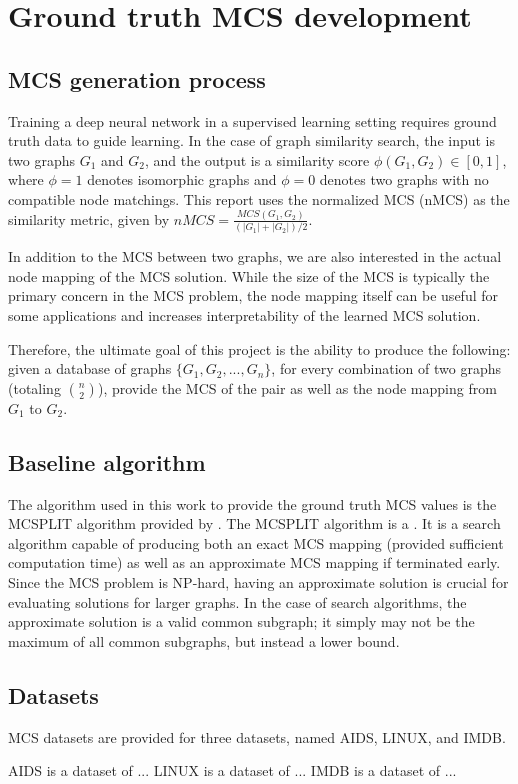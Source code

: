 \section{Ground truth MCS development}
\subsection{MCS generation process}
Training a deep neural network in a supervised learning setting requires ground truth data to guide learning. In the case of graph similarity search, the input is two graphs $G_1$ and $G_2$, and the output is a similarity score $\phi(G_1, G_2) \in [0, 1]$, where $\phi = 1$ denotes isomorphic graphs and $\phi = 0$ denotes two graphs with no compatible node matchings. This report uses the normalized MCS (nMCS) as the similarity metric, given by $nMCS = \frac{MCS(G_1, G_2)}{(|G_1| + |G_2|)/2}$.

In addition to the MCS between two graphs, we are also interested in the actual node mapping of the MCS solution. While the size of the MCS is typically the primary concern in the MCS problem, the node mapping itself can be useful for some applications and increases interpretability of the learned MCS solution.

Therefore, the ultimate goal of this project is the ability to produce the following: given a database of graphs $\{G_1, G_2, ..., G_n\}$, for every combination of two graphs (totaling ${n \choose 2}$), provide the MCS of the pair as well as the node mapping from $G_1$ to $G_2$.

\subsection{Baseline algorithm}
The algorithm used in this work to provide the ground truth MCS values is the MCSPLIT  algorithm provided by  . The MCSPLIT algorithm is a . It is a search algorithm capable of producing both an exact MCS mapping (provided sufficient computation time) as well as an approximate MCS mapping if terminated early. Since the MCS problem is NP-hard, having an approximate solution is crucial for evaluating solutions for larger graphs. In the case of search algorithms, the approximate solution is a valid common subgraph; it simply may not be the maximum of all common subgraphs, but instead a lower bound.

\subsection{Datasets}
MCS datasets are provided for three datasets, named  AIDS, LINUX, and IMDB.

AIDS is a dataset of ...
LINUX is a dataset of ...
IMDB is a dataset of ...
